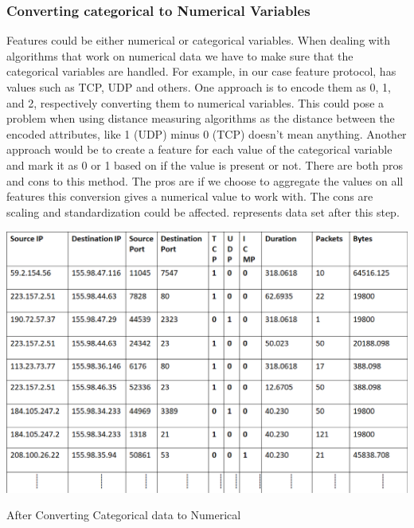 \subsubsection{Converting categorical to Numerical Variables} 

Features could be either numerical or categorical variables. When dealing with algorithms that work on numerical data we have to make sure that the categorical variables are handled.
For example, in our case feature protocol, has values such as TCP, UDP and others. One approach is to encode them as 0, 1, and 2, respectively converting them to numerical variables. This could pose a problem when using distance measuring algorithms as the distance between the encoded attributes, like 1 (UDP) minus 0 (TCP) doesn't mean anything. Another approach would be to create a feature for each value of the categorical variable and mark it as 0 or 1 based on if the value is present or not. There are both pros and cons to this method. The pros are if we choose to aggregate the values on all features this conversion gives a numerical value to work with. The cons are scaling and standardization could be affected.  represents data set after this step.

\begin{table}[ht]
	\centerline{\includegraphics[scale = 0.6]{categorical.png}}
	\caption{After Converting Categorical data to Numerical}%
\end{table}

